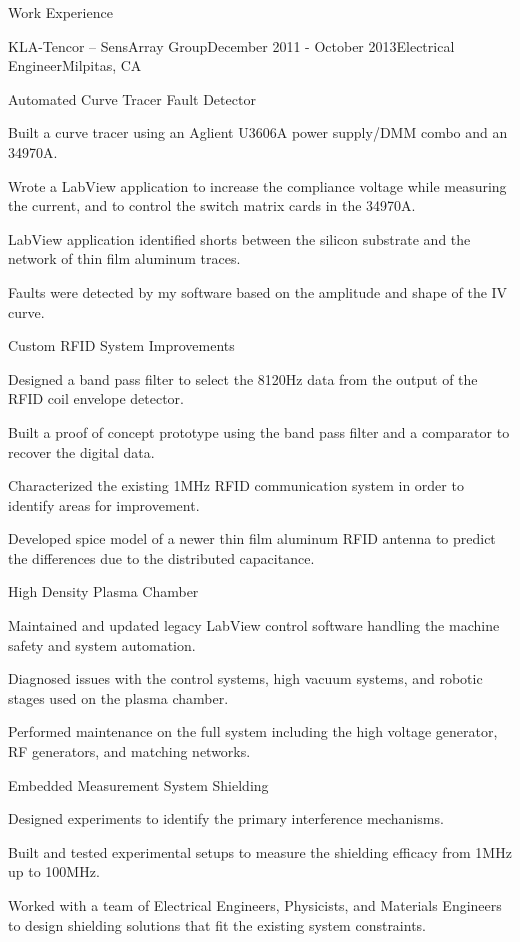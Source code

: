 \documentclass{resume} %
\begin{document}
\begin{rSection}{Work Experience}
\begin{rSubsection2}{KLA-Tencor -- SensArray Group}{December 2011 - October 2013}{Electrical Engineer}{Milpitas, CA}
\pagebreak[2]
\begin{rWorkProject}{Automated Curve Tracer Fault Detector}
\item Built a curve tracer using an Aglient U3606A power supply/DMM combo and an 34970A.
\item Wrote a LabView application to increase the compliance voltage while measuring the current, and to control the switch matrix cards in the 34970A.
\item LabView application identified shorts between the silicon substrate and the network of thin film aluminum traces.
\item Faults were detected by my software based on the amplitude and shape of the IV curve.
\end{rWorkProject}

\pagebreak[2]
\begin{rWorkProject}{Custom RFID System Improvements}
\item Designed a band pass filter to select the 8120Hz data from the output of the RFID coil envelope detector.
\item Built a proof of concept prototype using the band pass filter and a comparator to recover the digital data.
\item Characterized the existing 1MHz RFID communication system in order to identify areas for improvement.
\item Developed spice model of a newer thin film aluminum RFID antenna to predict the differences due to the distributed capacitance.
\end{rWorkProject}

\pagebreak[2]
\begin{rWorkProject}{High Density Plasma Chamber}
\item Maintained and updated legacy LabView control software handling the machine safety and system automation.
\item Diagnosed issues with the control systems, high vacuum systems, and robotic stages used on the plasma chamber.
\item Performed maintenance on the full system including the high voltage generator, RF generators, and matching networks.
\end{rWorkProject}

\pagebreak[2]
\begin{rWorkProject}{Embedded Measurement System Shielding}
\item Designed experiments to identify the primary interference mechanisms.
\item Built and tested experimental setups to measure the shielding efficacy from 1MHz up to 100MHz.
\item Worked with a team of Electrical Engineers, Physicists, and Materials Engineers to design shielding solutions that fit the existing system constraints.
\end{rWorkProject}


\end{rSubsection2}
\end{rSection}
\end{document}
